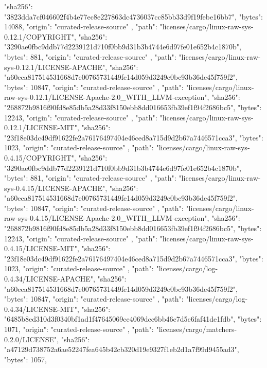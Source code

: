 {{      "sha256": "3823dda7cf046602f4b4e77ec8e227863dc4736037cc85bb33d9f19febe16bb7",
      "bytes": 14088,
      "origin": "curated-release-source"
    },
    {
      "path": "licenses/cargo/linux-raw-sys-0.12.1/COPYRIGHT",
      "sha256": "3290ae0fbc9ddb77d2239121d710f0bb9d31b3b4744e6d97fe01e652b4c1870b",
      "bytes": 881,
      "origin": "curated-release-source"
    },
    {
      "path": "licenses/cargo/linux-raw-sys-0.12.1/LICENSE-APACHE",
      "sha256": "a60eea817514531668d7e00765731449fe14d059d3249e0bc93b36de45f759f2",
      "bytes": 10847,
      "origin": "curated-release-source"
    },
    {
      "path": "licenses/cargo/linux-raw-sys-0.12.1/LICENSE-Apache-2.0_WITH_LLVM-exception",
      "sha256": "268872b9816f90fd8e85db5a28d33f8150ebb8dd016653fb39ef1f94f2686bc5",
      "bytes": 12243,
      "origin": "curated-release-source"
    },
    {
      "path": "licenses/cargo/linux-raw-sys-0.12.1/LICENSE-MIT",
      "sha256": "23f18e03dc49df91622fe2a76176497404e46ced8a715d9d2b67a7446571cca3",
      "bytes": 1023,
      "origin": "curated-release-source"
    },
    {
      "path": "licenses/cargo/linux-raw-sys-0.4.15/COPYRIGHT",
      "sha256": "3290ae0fbc9ddb77d2239121d710f0bb9d31b3b4744e6d97fe01e652b4c1870b",
      "bytes": 881,
      "origin": "curated-release-source"
    },
    {
      "path": "licenses/cargo/linux-raw-sys-0.4.15/LICENSE-APACHE",
      "sha256": "a60eea817514531668d7e00765731449fe14d059d3249e0bc93b36de45f759f2",
      "bytes": 10847,
      "origin": "curated-release-source"
    },
    {
      "path": "licenses/cargo/linux-raw-sys-0.4.15/LICENSE-Apache-2.0_WITH_LLVM-exception",
      "sha256": "268872b9816f90fd8e85db5a28d33f8150ebb8dd016653fb39ef1f94f2686bc5",
      "bytes": 12243,
      "origin": "curated-release-source"
    },
    {
      "path": "licenses/cargo/linux-raw-sys-0.4.15/LICENSE-MIT",
      "sha256": "23f18e03dc49df91622fe2a76176497404e46ced8a715d9d2b67a7446571cca3",
      "bytes": 1023,
      "origin": "curated-release-source"
    },
    {
      "path": "licenses/cargo/log-0.4.34/LICENSE-APACHE",
      "sha256": "a60eea817514531668d7e00765731449fe14d059d3249e0bc93b36de45f759f2",
      "bytes": 10847,
      "origin": "curated-release-source"
    },
    {
      "path": "licenses/cargo/log-0.4.34/LICENSE-MIT",
      "sha256": "6485b8ed310d3f0340bf1ad1f47645069ce4069dcc6bb46c7d5c6faf41de1fdb",
      "bytes": 1071,
      "origin": "curated-release-source"
    },
    {
      "path": "licenses/cargo/matchers-0.2.0/LICENSE",
      "sha256": "a47129d738752a6ae52247fea645b42cb320d19e9327f1eb2d1a7f99d9455ad3",
      "bytes": 1057,
}}
